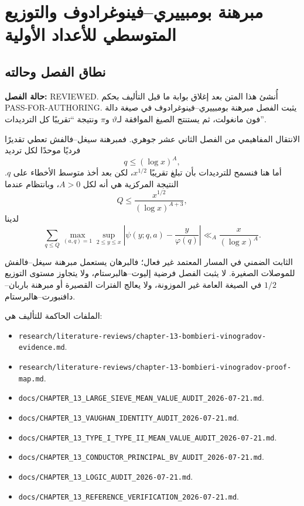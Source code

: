 \chapter{مبرهنة بومبييري--فينوغرادوف والتوزيع المتوسطي للأعداد الأولية}

\section{نطاق الفصل وحالته}

\noindent\textbf{حالة الفصل:} \textenglish{REVIEWED}. أُنشئ هذا المتن بعد
إغلاق بوابة ما قبل التأليف بحكم \textenglish{PASS-FOR-AUTHORING}. يثبت
الفصل مبرهنة بومبييري--فينوغرادوف في صيغة دالة فون مانغولت، ثم يستنتج
الصيغ الموافقة لـ\(\vartheta\) و\(\pi\) ونتيجة ``تقريبًا كل الترديدات''.

الانتقال المفاهيمي من الفصل الثاني عشر جوهري. فمبرهنة سيغل--فالفش تعطي
تقديرًا فرديًا موحدًا لكل ترديد
\[
q\le (\log x)^A,
\]
أما هنا فنسمح للترديدات بأن تبلغ تقريبًا \(x^{1/2}\)، لكن بعد أخذ متوسط
الأخطاء على \(q\). النتيجة المركزية هي أنه لكل \(A>0\)، وبانتظام عندما
\[
Q\le \frac{x^{1/2}}{(\log x)^{A+3}},
\]
لدينا
\[
\sum_{q\le Q}
\max_{(a,q)=1}
\sup_{2\le y\le x}
\left|
\psi(y;q,a)-\frac{y}{\varphi(q)}
\right|
\ll_A \frac{x}{(\log x)^A}.
\]

الثابت الضمني في المسار المعتمد غير فعال؛ فالبرهان يستعمل مبرهنة
سيغل--فالفش للموصلات الصغيرة. لا يثبت الفصل فرضية إليوت--هالبرستام، ولا
يتجاوز مستوى التوزيع \(1/2\) في الصيغة العامة غير الموزونة، ولا يعالج
الفترات القصيرة أو مبرهنة باربان--دافنبورت--هالبرستام.

الملفات الحاكمة للتأليف هي:
\begin{itemize}
  \item \texttt{research/literature-reviews/chapter-13-bombieri-vinogradov-evidence.md}.
  \item \texttt{research/literature-reviews/chapter-13-bombieri-vinogradov-proof-map.md}.
  \item \texttt{docs/CHAPTER\_13\_LARGE\_SIEVE\_MEAN\_VALUE\_AUDIT\_2026-07-21.md}.
  \item \texttt{docs/CHAPTER\_13\_VAUGHAN\_IDENTITY\_AUDIT\_2026-07-21.md}.
  \item \texttt{docs/CHAPTER\_13\_TYPE\_I\_TYPE\_II\_MEAN\_VALUE\_AUDIT\_2026-07-21.md}.
  \item \texttt{docs/CHAPTER\_13\_CONDUCTOR\_PRINCIPAL\_BV\_AUDIT\_2026-07-21.md}.
  \item \texttt{docs/CHAPTER\_13\_LOGIC\_AUDIT\_2026-07-21.md}.
  \item \texttt{docs/CHAPTER\_13\_REFERENCE\_VERIFICATION\_2026-07-21.md}.
\end{itemize}

